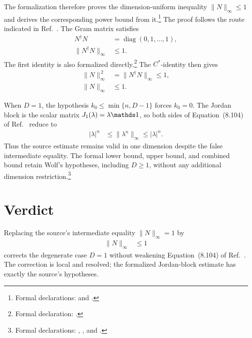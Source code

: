 \documentclass{article}
\begin{document}
The formalization therefore proves the dimension-uniform inequality
$\|N\|_{\infty}\leq 1$ and derives the corresponding power bound from
it.\footnote{Formal declarations:
 and
.}
The proof follows the route indicated in Ref.~\cite{Wolf2012Quantum}. The Gram
matrix satisfies
\begin{align}
    N^{\dagger}N
        &=\operatorname{diag}(0,1,\ldots,1),
    \label{eq:wolf_eq8104_shift_norm_one_dimensional_gram_identity}\\
    \bigl\|N^{\dagger}N\bigr\|_{\infty}
        &\leq 1.
    \label{eq:wolf_eq8104_shift_norm_one_dimensional_gram_norm_bound}
\end{align}
The first identity is also formalized directly.\footnote{Formal declaration:
.}
The $C^*$-identity then gives
\begin{align}
    \|N\|_{\infty}^{\,2}
        &=\bigl\|N^{\dagger}N\bigr\|_{\infty}
        \leq 1,
    \label{eq:wolf_eq8104_shift_norm_one_dimensional_cstar_norm_bound}\\
    \|N\|_{\infty}
        &\leq 1.
    \label{eq:wolf_eq8104_shift_norm_one_dimensional_shift_norm_bound}
\end{align}

When $D=1$, the hypothesis $k_0\leq\min\{n,D-1\}$ forces $k_0=0$. The Jordan
block is the scalar matrix $J_1(\lambda)=\lambda\Id$, so both sides of
Equation~(8.104) of Ref.~\cite{Wolf2012Quantum} reduce to
\begin{align}
    |\lambda|^n
        &\leq \|\lambda^n\|_{\infty}
        \leq |\lambda|^n.
    \label{eq:wolf_eq8104_shift_norm_one_dimensional_scalar_bounds}
\end{align}
Thus the source estimate remains valid in one dimension despite the false
intermediate equality. The formal lower bound, upper bound, and combined bound
retain Wolf's hypotheses, including $D\geq 1$, without any additional
dimension restriction.\footnote{Formal declarations:
,
, and
.}

\section{Verdict}

Replacing the source's intermediate equality $\|N\|_{\infty}=1$ by
\begin{align}
    \|N\|_{\infty}
        &\leq 1
    \label{eq:wolf_eq8104_shift_norm_one_dimensional_corrected_shift_statement}
\end{align}
corrects the degenerate case $D=1$ without weakening Equation~(8.104) of
Ref.~\cite{Wolf2012Quantum}. The correction is local and resolved; the
formalized Jordan-block estimate has exactly the source's hypotheses.



\end{document}
